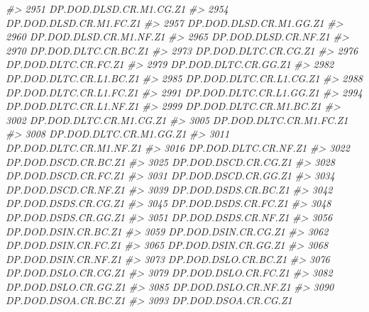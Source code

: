 \documentclass[
]{bxjsbook}
\newenvironment{Shaded}{\begin{snugshade}}{\end{snugshade}}
\newcommand{\CommentTok}[1]{\textcolor[rgb]{0.56,0.35,0.01}{\textit{#1}}}
\theoremstyle{definition}
\theoremstyle{definition}
\theoremstyle{definition}
\theoremstyle{definition}
\theoremstyle{remark}
\begin{document}
\begin{Shaded}
\begin{Highlighting}[]
\CommentTok{\#\textgreater{} 2951     DP.DOD.DLSD.CR.M1.CG.Z1}
\CommentTok{\#\textgreater{} 2954     DP.DOD.DLSD.CR.M1.FC.Z1}
\CommentTok{\#\textgreater{} 2957     DP.DOD.DLSD.CR.M1.GG.Z1}
\CommentTok{\#\textgreater{} 2960     DP.DOD.DLSD.CR.M1.NF.Z1}
\CommentTok{\#\textgreater{} 2965        DP.DOD.DLSD.CR.NF.Z1}
\CommentTok{\#\textgreater{} 2970        DP.DOD.DLTC.CR.BC.Z1}
\CommentTok{\#\textgreater{} 2973        DP.DOD.DLTC.CR.CG.Z1}
\CommentTok{\#\textgreater{} 2976        DP.DOD.DLTC.CR.FC.Z1}
\CommentTok{\#\textgreater{} 2979        DP.DOD.DLTC.CR.GG.Z1}
\CommentTok{\#\textgreater{} 2982     DP.DOD.DLTC.CR.L1.BC.Z1}
\CommentTok{\#\textgreater{} 2985     DP.DOD.DLTC.CR.L1.CG.Z1}
\CommentTok{\#\textgreater{} 2988     DP.DOD.DLTC.CR.L1.FC.Z1}
\CommentTok{\#\textgreater{} 2991     DP.DOD.DLTC.CR.L1.GG.Z1}
\CommentTok{\#\textgreater{} 2994     DP.DOD.DLTC.CR.L1.NF.Z1}
\CommentTok{\#\textgreater{} 2999     DP.DOD.DLTC.CR.M1.BC.Z1}
\CommentTok{\#\textgreater{} 3002     DP.DOD.DLTC.CR.M1.CG.Z1}
\CommentTok{\#\textgreater{} 3005     DP.DOD.DLTC.CR.M1.FC.Z1}
\CommentTok{\#\textgreater{} 3008     DP.DOD.DLTC.CR.M1.GG.Z1}
\CommentTok{\#\textgreater{} 3011     DP.DOD.DLTC.CR.M1.NF.Z1}
\CommentTok{\#\textgreater{} 3016        DP.DOD.DLTC.CR.NF.Z1}
\CommentTok{\#\textgreater{} 3022        DP.DOD.DSCD.CR.BC.Z1}
\CommentTok{\#\textgreater{} 3025        DP.DOD.DSCD.CR.CG.Z1}
\CommentTok{\#\textgreater{} 3028        DP.DOD.DSCD.CR.FC.Z1}
\CommentTok{\#\textgreater{} 3031        DP.DOD.DSCD.CR.GG.Z1}
\CommentTok{\#\textgreater{} 3034        DP.DOD.DSCD.CR.NF.Z1}
\CommentTok{\#\textgreater{} 3039        DP.DOD.DSDS.CR.BC.Z1}
\CommentTok{\#\textgreater{} 3042        DP.DOD.DSDS.CR.CG.Z1}
\CommentTok{\#\textgreater{} 3045        DP.DOD.DSDS.CR.FC.Z1}
\CommentTok{\#\textgreater{} 3048        DP.DOD.DSDS.CR.GG.Z1}
\CommentTok{\#\textgreater{} 3051        DP.DOD.DSDS.CR.NF.Z1}
\CommentTok{\#\textgreater{} 3056        DP.DOD.DSIN.CR.BC.Z1}
\CommentTok{\#\textgreater{} 3059        DP.DOD.DSIN.CR.CG.Z1}
\CommentTok{\#\textgreater{} 3062        DP.DOD.DSIN.CR.FC.Z1}
\CommentTok{\#\textgreater{} 3065        DP.DOD.DSIN.CR.GG.Z1}
\CommentTok{\#\textgreater{} 3068        DP.DOD.DSIN.CR.NF.Z1}
\CommentTok{\#\textgreater{} 3073        DP.DOD.DSLO.CR.BC.Z1}
\CommentTok{\#\textgreater{} 3076        DP.DOD.DSLO.CR.CG.Z1}
\CommentTok{\#\textgreater{} 3079        DP.DOD.DSLO.CR.FC.Z1}
\CommentTok{\#\textgreater{} 3082        DP.DOD.DSLO.CR.GG.Z1}
\CommentTok{\#\textgreater{} 3085        DP.DOD.DSLO.CR.NF.Z1}
\CommentTok{\#\textgreater{} 3090        DP.DOD.DSOA.CR.BC.Z1}
\CommentTok{\#\textgreater{} 3093        DP.DOD.DSOA.CR.CG.Z1}

\end{Highlighting}
\end{Shaded}
\end{document}
